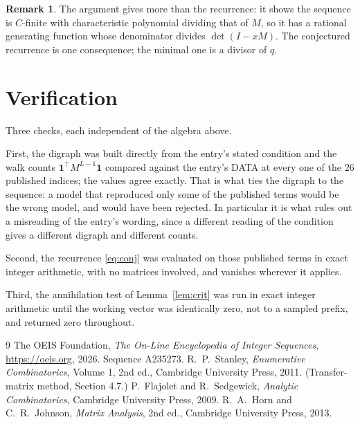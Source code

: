\documentclass[11pt,a4paper]{article}
\theoremstyle{plain}
\theoremstyle{definition}
\newtheorem{remark}[theorem]{Remark}
\begin{document}
\begin{remark}
The argument gives more than the recurrence: it shows the sequence is $C$-finite with
characteristic polynomial dividing that of $M$, so it has a rational generating function
whose denominator divides $\det(I-xM)$. The conjectured recurrence is one consequence; the
minimal one is a divisor of $q$.
\end{remark}

\section{Verification}

Three checks, each independent of the algebra above.

First, the digraph was built directly from the entry's stated condition and the walk counts
$\mathbf{1}^{\!\top}M^{L-1}\mathbf{1}$ compared against the entry's DATA at
every one of the $26$ published indices; the values agree exactly. That is what ties
the digraph to the sequence: a model that reproduced only some of the published terms would
be the wrong model, and would have been rejected. In particular it is what rules out a
misreading of the entry's wording, since a different reading of the condition gives a
different digraph and different counts.

Second, the recurrence \eqref{eq:conj} was evaluated on those published terms in exact
integer arithmetic, with no matrices involved, and vanishes wherever it applies.

Third, the annihilation test of Lemma~\ref{lem:crit} was run in exact integer arithmetic
until the working vector was identically zero, not to a sampled prefix, and returned zero
throughout.

\begin{thebibliography}{9}
 The OEIS Foundation, \emph{The On-Line Encyclopedia of Integer
Sequences}, \url{https://oeis.org}, 2026. Sequence A235273.
 R.~P.~Stanley, \emph{Enumerative Combinatorics}, Volume 1, 2nd ed.,
Cambridge University Press, 2011. (Transfer-matrix method, Section 4.7.)
 P.~Flajolet and R.~Sedgewick, \emph{Analytic Combinatorics}, Cambridge
University Press, 2009.
 R.~A.~Horn and C.~R.~Johnson, \emph{Matrix Analysis}, 2nd ed., Cambridge
University Press, 2013.
\end{thebibliography}
\end{document}
